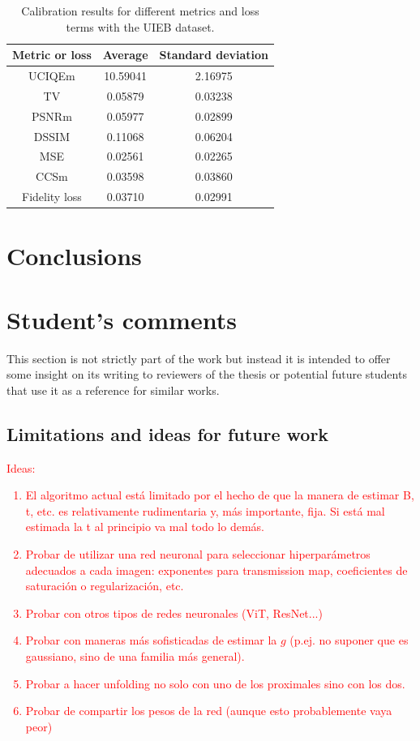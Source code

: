 \documentclass[twocolumn,twoside,a4paper,10pt]{IEEEtran}
\newcommand{\Frank}[1]{\textcolor{red}{#1}}
\begin{document}
\begin{table}[h]
\centering
\caption{Calibration results for different metrics and loss terms with the UIEB dataset.}
\begin{tabular}{|c|c|c|}
\hline
\textbf{Metric or loss} & \textbf{Average} & \textbf{Standard deviation} \\ \hline
UCIQEm                  & 10.59041         & 2.16975                     \\ \hline
TV                      & 0.05879          & 0.03238                     \\ \hline
PSNRm                   & 0.05977          & 0.02899                     \\ \hline
DSSIM                   & 0.11068          & 0.06204                     \\ \hline
MSE                     & 0.02561          & 0.02265                     \\ \hline
CCSm                    & 0.03598          & 0.03860                     \\ \hline
Fidelity loss           & 0.03710          & 0.02991                     \\ \hline
\end{tabular}
\end{table}


\section{Conclusions}

\section{Student's comments}
This section is not strictly part of the work but instead it is intended to offer some insight on its writing to reviewers of the thesis or potential future students that use it as a reference for similar works.
\subsection{Limitations and ideas for future work}
\Frank{
Ideas:
\begin{enumerate}
  \item El algoritmo actual está limitado por el hecho de que la manera de estimar B, t, etc. es relativamente rudimentaria y, más importante, fija. Si está mal estimada la t al principio va mal todo lo demás.
  \item Probar de utilizar una red neuronal para seleccionar hiperparámetros adecuados a cada imagen: exponentes para transmission map, coeficientes de saturación o regularización, etc.
  \item Probar con otros tipos de redes neuronales (ViT, ResNet...)
  \item Probar con maneras más sofisticadas de estimar la \(g\) (p.ej. no suponer que es gaussiano, sino de una familia más general).
  \item Probar a hacer unfolding no solo con uno de los proximales sino con los dos.
  \item Probar de compartir los pesos de la red (aunque esto probablemente vaya peor)
\end{enumerate}
}
\end{document}
